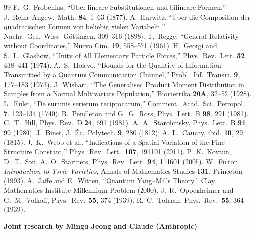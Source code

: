 \documentclass[12pt]{article}
\theoremstyle{remark}
\theoremstyle{definition}
\begin{document}
\begin{thebibliography}{99}
 F.~G.~Frobenius, ``\"Uber lineare Substitutionen und bilineare Formen,'' J.~Reine Angew.~Math. \textbf{84}, 1--63 (1877).
 A.~Hurwitz, ``\"Uber die Composition der quadratischen Formen von beliebig vielen Variabeln,'' Nachr.~Ges.~Wiss.~G\"ottingen, 309--316 (1898).
 T.~Regge, ``General Relativity without Coordinates,'' Nuovo Cim. \textbf{19}, 558--571 (1961).
 H.~Georgi and S.~L.~Glashow, ``Unity of All Elementary Particle Forces,'' Phys.~Rev.~Lett. \textbf{32}, 438--441 (1974).
 A.~S.~Holevo, ``Bounds for the Quantity of Information Transmitted by a Quantum Communication Channel,'' Probl.~Inf.~Transm. \textbf{9}, 177--183 (1973).
 J.~Wishart, ``The Generalised Product Moment Distribution in Samples from a Normal Multivariate Population,'' Biometrika \textbf{20A}, 32--52 (1928).
 L.~Euler, ``De summis serierum reciprocarum,'' Comment.~Acad.~Sci.~Petropol. \textbf{7}, 123--134 (1740).
 B.~Pendleton and G.~G.~Ross, Phys.~Lett.~B \textbf{98}, 291 (1981).
 C.~T.~Hill, Phys.~Rev.~D \textbf{24}, 691 (1981).
 A.~A.~Starobinsky, Phys.~Lett.~B \textbf{91}, 99 (1980).
 J.~Binet, J.~\'Ec.~Polytech. \textbf{9}, 280 (1812); A.~L.~Cauchy, ibid. \textbf{10}, 29 (1815).
 J.~K.~Webb et al., ``Indications of a Spatial Variation of the Fine Structure Constant,'' Phys.~Rev.~Lett.\ \textbf{107}, 191101 (2011).
 P.~K.~Kovtun, D.~T.~Son, A.~O.~Starinets, Phys.~Rev.~Lett.\ \textbf{94}, 111601 (2005).
 W.~Fulton, \textit{Introduction to Toric Varieties}, Annals of Mathematics Studies \textbf{131}, Princeton (1993).
 A.~Jaffe and E.~Witten, ``Quantum Yang--Mills Theory,'' Clay Mathematics Institute Millennium Problem (2000).
 J.~R.~Oppenheimer and G.~M.~Volkoff, Phys.~Rev.\ \textbf{55}, 374 (1939).
 R.~C.~Tolman, Phys.~Rev.\ \textbf{55}, 364 (1939).
\end{thebibliography}

\bigskip
\noindent\textbf{Joint research by Mingu Jeong and Claude (Anthropic).}
\end{document}
